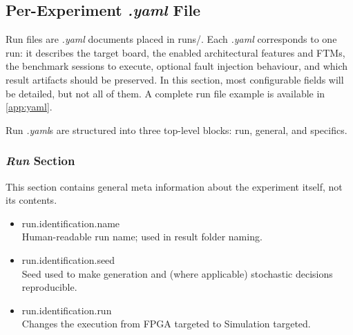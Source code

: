 \subsection{Per-Experiment \textit{.yaml} File}
\label{chap3:ui_yaml}

 Run files are \textit{.yaml} documents placed in runs/. Each \textit{.yaml} corresponds to one run: it describes the target board, the enabled architectural features and \acp{FTM}, the benchmark sessions to execute, optional fault injection behaviour, and which result artifacts should be preserved. In this section, most configurable fields will be detailed, but not all of them. A complete run file example is available in \cref{app:yaml}.

 Run \textit{.yaml}s are structured into three top-level blocks: run, general, and specifics.

\subsubsection{\textit{Run} Section}
 This section contains general meta information about the experiment itself, not its contents.
\begin{itemize}
    \item run.identification.name \\
    Human-readable run name; used in result folder naming.
    \item run.identification.seed \\
    Seed used to make generation and (where applicable) stochastic decisions reproducible.
    \item run.identification.run \\
    Changes the execution from FPGA targeted to Simulation targeted.
\end{itemize}

